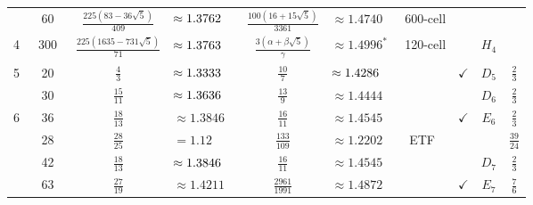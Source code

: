 \documentclass[10pt,aps,notitlepage,onecolumn,pra,superscriptaddress]{revtex4-1}
\newcommand{\cc}{\cellcolor[gray]{0.9}}
\begin{document}
\begin{table}[ht!]
\begin{tabular}{|c|c|cl|cl|c|c|c|c|}
                         & 60                  & $\frac{225(83-36\sqrt5)}{409}$          & $\approx1.3762\hphantom{^*}$~\cite{PV22} & $\frac{100(16+15\sqrt5)}{3361}$           & $\approx1.4740$                           & 600-cell              &              &                         &                          \\ \cline{2-8}\cline{10-10}
    \multirow{-3}{*}{4}  & ~300~               & $\frac{225(1635-731\sqrt5)}{71}$        & $\approx1.3763\hphantom{^*}$~\cite{PV22} & \cc$\frac{3(\alpha+\beta\sqrt5)}{\gamma}$ & \cc$\approx1.4996^*$                      & 120-cell              &              & \multirow{-2}{*}{$H_4$} &                          \\ \hline
    5                    & 20                  & $\frac43$                               & $\approx1.3333\hphantom{^*}$~\cite{FR94} & $\frac{10}{7}$                            & $\approx1.4286\hphantom{^*}$~\cite{FR94}  &                       & $\checkmark$ & $D_5$                   & $\frac23$                \\ \hline
                         & 30                  & $\frac{15}{11}$                         & $\approx1.3636\hphantom{^*}$~\cite{FR94} & $\frac{13}{9}$                            & $\approx1.4444$                           &                       &              & $D_6$                   & $\frac23$                \\ \cline{2-10}
    \multirow{-2}{*}{6}  & 36                  & $\frac{18}{13}$                         & $\approx1.3846$                          & $\frac{16}{11}$                           & $\approx1.4545$                           &                       & $\checkmark$ & $E_6$                   & $\frac23$                \\ \hline
                         & 28                  & $\frac{28}{25}$                         & $=1.12$                                  & $\frac{133}{109}$                         & $\approx1.2202$                           & ETF~\cite{LS66}       &              &                         & $\frac{39}{24}$          \\ \cline{2-10}
                         & 42                  & $\frac{18}{13}$                         & $\approx1.3846\hphantom{^*}$~\cite{FR94} & $\frac{16}{11}$                           & $\approx1.4545$                           &                       &              & $D_7$                   & $\frac23$                \\ \cline{2-10}
                         & 63                  & $\frac{27}{19}$                         & $\approx1.4211$                          & \cc$\frac{2961}{1991}$                    & \cc$\approx1.4872$                        &                       & $\checkmark$ & $E_7$                   & $\frac76$                \\ \cline{2-10}

\end{tabular}
\end{table}
\end{document}
